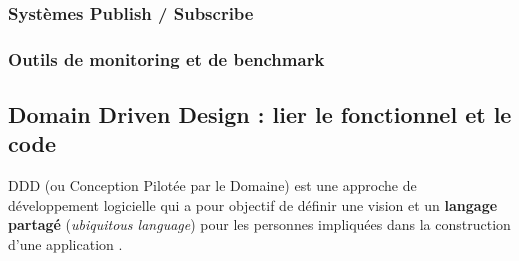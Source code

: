 	\subsubsection{Systèmes Publish / Subscribe}
	\subsubsection{Outils de monitoring et de benchmark}
	
	\subsection{Domain Driven Design : lier le fonctionnel et le code}
	
	\gls{DDD} (ou Conception Pilotée par le Domaine) est une approche de 
	développement logicielle qui a pour objectif de définir une vision et un 
	\textbf{langage partagé} (\textit{ubiquitous language}) pour les personnes 
	impliquées dans la construction d'une application \cite{Evans2003}. 
	
